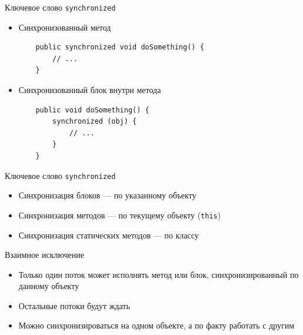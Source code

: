 \documentclass[unicode,mathserif]{beamer}
\begin{document}
\begin{frame}[fragile]{Ключевое слово \texttt{synchronized}}
\begin{itemize}
\item Синхронизованный метод
    \begin{lstlisting}
    public synchronized void doSomething() {
        // ...
    }
    \end{lstlisting}
    \bigskip

\item Синхронизованный блок внутри метода
    \begin{lstlisting}
    public void doSomething() {
        synchronized (obj) {
            // ...
        }
    }
    \end{lstlisting}
\end{itemize}
\end{frame}


\begin{frame}{Ключевое слово \texttt{synchronized}}
\begin{itemize}
\item Синхронизация блоков --- по указанному объекту
    \bigskip

\item Синхронизация методов --- по текущему объекту (\lstinline|this|)
    \bigskip

\item Синхронизация статических методов --- по классу
\end{itemize}
\end{frame}


\begin{frame}{Взаимное исключение}
\begin{itemize}
\item Только один поток может исполнять метод или блок,
    синхронизированный по данному объекту
    \bigskip

\item Остальные потоки будут ждать
    \bigskip

\item Можно синхронизироваться на одном объекте,
    а по факту работать с другим
\end{itemize}
\end{frame}
\end{document}

